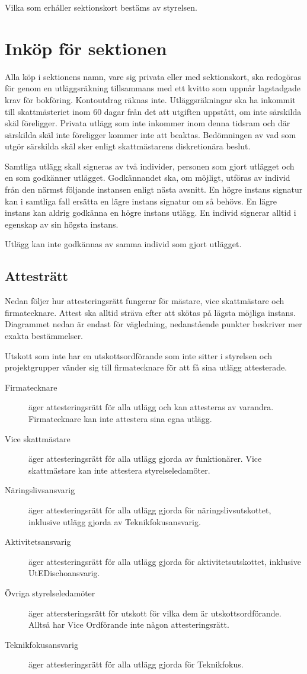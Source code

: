 \documentclass{dsekprotokoll}
\begin{document}
Vilka som erhåller sektionskort bestäms av styrelsen.

\section{Inköp för sektionen}
Alla köp i sektionens namn, vare sig privata eller med sektionskort,
ska redogöras för genom en utläggsräkning tillsammans med ett kvitto
som uppnår lagstadgade krav för bokföring.
Kontoutdrag räknas inte. Utläggsräkningar ska ha inkommit till
skattmästeriet inom 60 dagar från det att utgiften uppstått, om inte
särskilda skäl föreligger.
Privata utlägg som inte inkommer inom denna tidsram och där särskilda
skäl inte föreligger kommer inte att beaktas. Bedömningen av vad som
utgör särskilda skäl sker enligt
skattmästarens diskretionära beslut.

Samtliga utlägg skall signeras av två individer, personen som gjort utlägget och
en som godkänner utlägget. Godkännandet ska, om möjligt, utföras av individ
från den närmst följande instansen enligt nästa avsnitt. En högre instans
signatur kan i samtliga fall ersätta en lägre instans signatur om så
behövs. En lägre instans kan aldrig godkänna en högre instans utlägg. En individ
signerar alltid i egenskap av sin högsta instans.

Utlägg kan inte godkännas av samma individ som gjort utlägget.

\subsection{Attesträtt}
Nedan följer hur attesteringsrätt fungerar för mästare, vice skattmästare och
firmatecknare.  Attest ska alltid sträva efter att skötas på lägsta möjliga
instans. Diagrammet nedan är endast för vägledning, nedanstående punkter
beskriver mer exakta bestämmelser.

Utskott som inte har en utskottsordförande som inte sitter i styrelsen och
projektgrupper vänder sig till firmatecknare för att få sina utlägg
attesterade.

\begin{description}
  \item[Firmatecknare] äger attesteringsrätt för alla utlägg och kan attesteras
    av varandra. Firmatecknare kan inte attestera sina egna utlägg.
  \item[Vice skattmästare] äger attesteringsrätt för alla utlägg gjorda av
    funktionärer. Vice skattmästare kan inte attestera styrelseledamöter.
  \item[Näringslivsansvarig] äger attesteringsrätt för alla utlägg gjorda för
    näringslivsutskottet, inklusive utlägg gjorda av Teknikfokusansvarig.
  \item[Aktivitetsansvarig] äger attesteringsrätt för alla utlägg gjorda för
    aktivitetsutskottet, inklusive UtEDischoansvarig.
  \item[Övriga styrelseledamöter] äger attersteringsrätt för utskott för vilka
    dem är utskottsordförande. Alltså har Vice Ordförande inte någon
    attesteringsrätt.
  \item[Teknikfokusansvarig] äger attesteringsrätt för alla utlägg gjorda för
    Teknikfokus.
\end{description}
\end{document}
